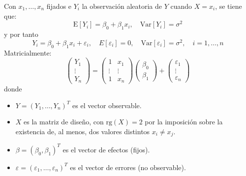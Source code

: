 \documentclass[12pt]{article}
\newcommand{\E}{\mathrm{E}}
\newcommand{\V}{\mathrm{Var}}
\newcommand{\rg}{\text{rg}}
\begin{document}
\begin{ejercicio}
\begin{enumerate}[label=\alph*)]
\begin{enumerate}[label=\alph*)]
                    Con $x_1, \ldots, x_n$ fijados e $Y_i$ la observación aleatoria de $Y$ cuando
                    $X = x_i$, se tiene que:
                    $$\E[Y_i] = \beta_0 + \beta_1 x_i, \quad \V[Y_i] = \sigma^2$$
                    y por tanto
                    $$Y_i = \beta_0 + \beta_1 x_i + \varepsilon_i, \quad E[\varepsilon_i] = 0,
                    \quad \V[\varepsilon_i] = \sigma^2, \quad i = 1, \ldots, n$$
                    Matricialmente:
                    $$\begin{pmatrix}
                        Y_1 \\
                        \vdots \\
                        Y_n
                    \end{pmatrix} = 
                    \begin{pmatrix}
                        1 & x_1 \\
                        \vdots & \vdots \\
                        1 & x_n
                    \end{pmatrix} 
                    \begin{pmatrix}
                        \beta_0 \\
                        \beta_1
                    \end{pmatrix}
                    +
                    \begin{pmatrix}
                        \varepsilon_1 \\
                        \vdots \\
                        \varepsilon_n
                    \end{pmatrix}$$
                    donde
                    \begin{itemize}
                        \item $Y = (Y_1, \ldots, Y_n)^T$ es el vector observable.
                        \item $X$ es la matriz de diseño, con $\rg(X) = 2$ por la imposición
                        sobre la existencia de, al menos, dos valores distintos $x_i \neq x_j$.
                        \item $\beta = (\beta_0, \beta_1)^T$ es el vector de efectos (fijos).
                        \item $\varepsilon = (\varepsilon_1, \ldots, \varepsilon_n)^T$ es el vector
                        de errores (no observable).
                    \end{itemize} 

\end{enumerate}
\end{enumerate}
\end{ejercicio}
\end{document}

